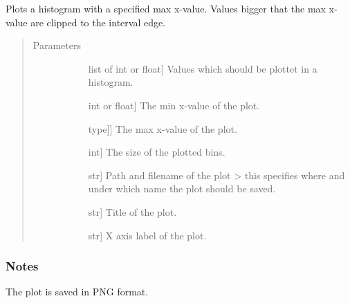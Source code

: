 \documentclass[letterpaper,10pt,english]{sphinxmanual}
\begin{document}

\begin{fulllineitems}
\label{\detokenize{index:gps2net.plotAndSaveHistogram}}
Plots a histogram with a specified max x-value. Values bigger that the max x-value are clipped to the interval edge.
\begin{quote}\begin{description}
\item[{Parameters}] \leavevmode\begin{description}
\item[{}] \leavevmode{[}list of int or float{]}
Values which should be plottet in a histogram.

\item[{}] \leavevmode{[}int or float{]}
The min x-value of the plot.

\item[{}] \leavevmode{[}{[}type{]}{]}
The max x-value of the plot.

\item[{}] \leavevmode{[}int{]}
The size of the plotted bins.

\item[{}] \leavevmode{[}str{]}
Path and filename of the plot \textendash{}\textgreater{} this specifies where and under which name the plot should be saved.

\item[{}] \leavevmode{[}str{]}
Title of the plot.

\item[{}] \leavevmode{[}str{]}
X axis label of the plot.

\end{description}

\end{description}\end{quote}
\subsubsection*{Notes}

The plot is saved in PNG format.

\end{fulllineitems}
\end{document}

